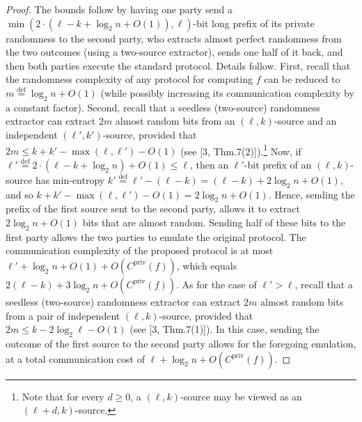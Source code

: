 \documentclass[10pt,a4paper]{article}
\begin{document}
\begin{proof}
The bounds follow by having one party send a $\min(2\cdot(\ell-k+\log_2n+O(1)),\ell)$-bit long prefix of its private randomness to the second party, who extracts almost perfect randomness from the two outcomes (using a two-source extractor), sends one half of it back, and then both parties execute the standard protocol. Details follow.
First, recall that the randomness complexity of any protocol for computing $f$ can be reduced to $m\stackrel{\mathrm{def}}=\log_2n+O(1)$ (while possibly increasing its communication complexity by a constant factor). Second, recall that a seedless (two-source) randomness extractor can extract $2m$ almost random bits from an $(\ell,k)$-source and an independent $(\ell',k')$-source, provided that $2m\le k+k'-\max(\ell,\ell')-O(1)$ (see [3, Thm.7(2)]).\footnote{Note that for every $d\ge0$, a $(\ell,k)$-source may be viewed as an $(\ell+d,k)$-source.} Now, if $\ell'\stackrel{\mathrm{def}}=2\cdot(\ell-k+\log_2n)+O(1)\le\ell$, then an $\ell'$-bit prefix of an $(\ell,k)$-source has min-entropy $k'\stackrel{\mathrm{def}}=\ell'-(\ell-k)=(\ell-k)+2\log_2n+O(1)$, and so $k+k'-\max(\ell,\ell')-O(1)=2\log_2n+O(1)$. Hence, sending the prefix of the first source sent to the second party, allows it to extract $2\log_2n+O(1)$ bits that are almost random. Sending half of these bits to the first party allows the two parties to emulate the original protocol. The communication complexity of the proposed protocol is at most $\ell'+\log_2n+O(1)+O(C^{\mathrm{priv}}(f))$, which equals $2(\ell-k)+3\log_2n+O(C^{\mathrm{priv}}(f))$.
As for the case of $\ell'>\ell$, recall that a seedless (two-source) randomness extractor can extract $2m$ almost random bits from a pair of independent $(\ell,k)$-source, provided that $2m\le k-2\log_2\ell-O(1)$ (see [3, Thm.7(1)]). In this case, sending the outcome of the first source to the second party allows for the foregoing emulation, at a total communication cost of $\ell+\log_2n+O(C^{\mathrm{priv}}(f))$.
\end{proof}
\end{document}
